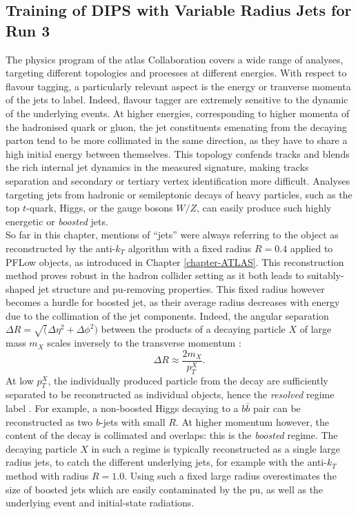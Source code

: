 \subsection{Training of DIPS with Variable Radius Jets for Run 3}\label{chapter:dipsVRtrain}
The physics program of the \gls{atlas} Collaboration covers a wide range of analyses, targeting different topologies and processes at different energies. With respect to flavour tagging, a particularly relevant aspect is the energy or tranverse momenta of the jets to label. Indeed, flavour tagger are extremely sensitive to the dynamic of the underlying events. At higher energies, corresponding to higher momenta of the hadronised quark or gluon, the jet constituents emenating from the decaying parton tend to be more collimated in the same direction, as they have to share a high initial energy between themselves. This topology confends tracks and blends the rich internal jet dynamics in the measured signature, making tracks separation and secondary or tertiary vertex identification more difficult. Analyses targeting jets from hadronic or semileptonic decays of heavy particles, such as the top $t$-quark, Higgs, or the gauge bosons $W/Z$, can easily produce such highly energetic or \textit{boosted} jets.  \\

So far in this chapter, mentions of ``jets'' were always referring to the object as reconstructed by the anti-$k_T$ algorithm with a fixed radius $R = 0.4$ applied to PFLow objects, as introduced in Chapter \ref{chapter-ATLAS}. This reconstruction method proves robust in the hadron collider setting as it both leads to suitably-shaped jet structure and \gls{pu}-removing properties. This fixed radius however becomes a hurdle for boosted jet, as their average radius decreases with energy due to the collimation of the jet components. Indeed, the angular separation $\Delta R = \sqrt(\Delta\eta^2 + \Delta \phi^2)$ between the products of a decaying particle $X$ of large mass $m_X$ scales inversely to the transverse momentum \cite{ATLAS:largeRjet}: 
\begin{equation}\label{eq:sizeJet}
  \Delta R \approx \frac{2 m_X}{p_T^X}.
\end{equation}
At low $p_T^X$, the individually produced particle from the decay are sufficiently separated to be reconstructed as individual objects, hence the \textit{resolved} regime label \cite{ATLAS:2016hcf}. For example, a non-boosted Higgs decaying to a $b\bar{b}$ pair can be reconstructed as two $b$-jets with small $R$. At higher momentum however, the content of the decay is collimated and overlaps: this is the \textit{boosted} regime. The decaying particle $X$ in such a regime is typically reconstructed as a single large radius jets, to catch the different underlying jets, for example with the anti-$k_T$ method with radius $R = 1.0$. Using such a fixed large radius overestimates the size of boosted jets which are easily contaminated by the \gls{pu}, as well as the underlying event and initial-state radiations.  \\

